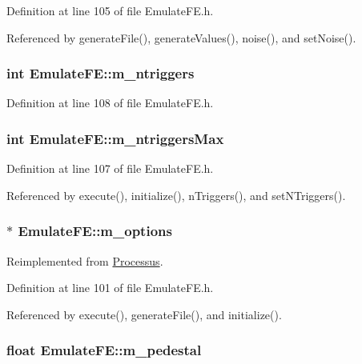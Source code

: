 Definition at line 105 of file EmulateFE.h.

Referenced by generateFile(), generateValues(), noise(), and setNoise().\hypertarget{classEmulateFE_a8df57e3d66bde60e9a79cb2ae54a9f4a}{
\subsubsection[{m\_\-ntriggers}]{\setlength{\rightskip}{0pt plus 5cm}int {\bf EmulateFE::m\_\-ntriggers}}}
\label{classEmulateFE_a8df57e3d66bde60e9a79cb2ae54a9f4a}


Definition at line 108 of file EmulateFE.h.\hypertarget{classEmulateFE_a2d473d12faf30f4870458874d70c7f55}{
\subsubsection[{m\_\-ntriggersMax}]{\setlength{\rightskip}{0pt plus 5cm}int {\bf EmulateFE::m\_\-ntriggersMax}}}
\label{classEmulateFE_a2d473d12faf30f4870458874d70c7f55}


Definition at line 107 of file EmulateFE.h.

Referenced by execute(), initialize(), nTriggers(), and setNTriggers().\hypertarget{classEmulateFE_a2f2da7d4b2164c47673a6ecc6dcef1ea}{
\subsubsection[{m\_\-options}]{$\ast$ {\bf EmulateFE::m\_\-options}}}
\label{classEmulateFE_a2f2da7d4b2164c47673a6ecc6dcef1ea}


Reimplemented from \hyperlink{classProcessus_a74205f3c1e00c4448f7b3257c2351797}{Processus}.

Definition at line 101 of file EmulateFE.h.

Referenced by execute(), generateFile(), and initialize().\hypertarget{classEmulateFE_a033996ce759c11305395ac865a6c074a}{
\subsubsection[{m\_\-pedestal}]{\setlength{\rightskip}{0pt plus 5cm}float {\bf EmulateFE::m\_\-pedestal}}}
\label{classEmulateFE_a033996ce759c11305395ac865a6c074a}


